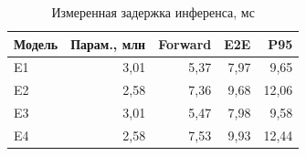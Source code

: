 \begin{table}[t]
\caption{Измеренная задержка инференса, мс}
\label{tab:latency}
\centering
\footnotesize
\setlength{\tabcolsep}{2.6pt}
\begin{tabular}{@{}lrrrr@{}}
\toprule
Модель & Парам., млн & Forward & E2E & P95 \\
\midrule
E1 & 3,01 & 5,37 & 7,97 & 9,65 \\
E2 & 2,58 & 7,36 & 9,68 & 12,06 \\
E3 & 3,01 & 5,47 & 7,98 & 9,58 \\
E4 & 2,58 & 7,53 & 9,93 & 12,44 \\
\bottomrule
\end{tabular}
\end{table}
